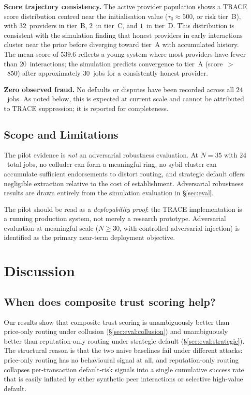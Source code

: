 \documentclass[sigconf,nonacm,10pt]{acmart}
\begin{document}
\noindent\textbf{Score trajectory consistency.}
The active provider population shows a TRACE score distribution
centred near the initialisation value ($\tau_0 \approx 500$, or
risk tier~B), with $32$~providers in tier~B, $2$~in tier~C, and
$1$~in tier~D. This distribution is consistent with the simulation
finding that honest providers in early interactions cluster near
the prior before diverging toward tier~A with accumulated history.
The mean score of $539.6$ reflects a young system where most
providers have fewer than $20$~interactions; the simulation predicts
convergence to tier~A (score~$>$~850) after approximately $30$~jobs
for a consistently honest provider.

\noindent\textbf{Zero observed fraud.}
No defaults or disputes have been recorded across all $24$~jobs.
As noted below, this is expected at current scale and cannot be
attributed to TRACE suppression; it is reported for completeness.

\subsection{Scope and Limitations}

The pilot evidence is \emph{not} an adversarial robustness evaluation.
At $N{=}35$ with $24$~total jobs, no colluder can form a meaningful
ring, no sybil cluster can accumulate sufficient endorsements to
distort routing, and strategic default offers negligible extraction
relative to the cost of establishment. Adversarial robustness results
are drawn entirely from the simulation evaluation in
\S\ref{sec:eval}.

The pilot should be read as a \emph{deployability proof}: the TRACE
implementation is a running production system, not merely a research
prototype. Adversarial evaluation at meaningful scale ($N \geq 30$,
with controlled adversarial injection) is identified as the primary
near-term deployment objective.

\section{Discussion}
\label{sec:discussion}

\subsection{When does composite trust scoring help?}

Our results show that composite trust scoring is unambiguously
better than price-only routing under collusion
(\S\ref{sec:eval:collusion}) and unambiguously better than
reputation-only routing under strategic default
(\S\ref{sec:eval:strategic}). The structural reason is that the
two naive baselines fail under different attacks: price-only
routing has no behavioural signal at all, and reputation-only
routing collapses per-transaction default-risk signals into a
single cumulative success rate that is easily inflated by either
synthetic peer interactions or selective high-value default.
\end{document}
